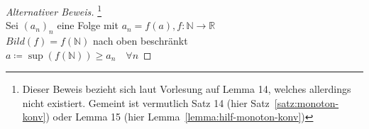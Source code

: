 \documentclass[11pt, twoside, a4paper]{article}
\theoremstyle{plain}
\newcommand{\pair}[1]{\left(#1\right)}
\newcommand{\definedas}[0]{\coloneqq}
\newcommand{\fromto}{\rightarrow{}}
\newcommand{\naturalnumbers}{\mathbb{N}}
\newcommand{\realnumbers}{\mathbb{R}}
\begin{document}
    \begin{proof}[Alternativer Beweis]
        \footnote{Dieser Beweis bezieht sich laut Vorlesung auf Lemma 14, welches allerdings nicht existiert. Gemeint ist vermutlich Satz 14 (hier Satz~\ref{satz:monoton-konv}) oder Lemma 15 (hier Lemma~\ref{lemma:hilf-monoton-konv})}
        ~\\
        Sei $(a_n)_n$ eine Folge mit $a_n = f(a), f:\naturalnumbers\fromto\realnumbers$\\
        $Bild(f) = f(\naturalnumbers)$ nach oben beschränkt\\
        $a\definedas\sup\pair{f\pair{\naturalnumbers}}\geq a_n \quad\forall n$
    \end{proof}

    \newpage

\end{document}
